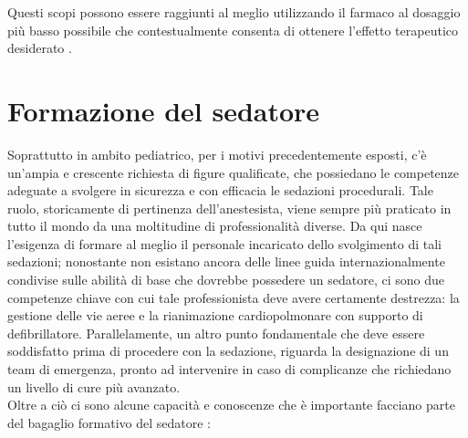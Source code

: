 Questi scopi possono essere raggiunti al meglio utilizzando il farmaco al dosaggio più basso possibile che contestualmente consenta di ottenere l'effetto terapeutico desiderato \cite{Guidelines2019}.

\section{Formazione del sedatore}

Soprattutto in ambito pediatrico, per i motivi precedentemente esposti, c'è un'ampia e crescente richiesta di figure qualificate, che possiedano le competenze adeguate a svolgere in sicurezza e con efficacia le sedazioni procedurali. Tale ruolo, storicamente di pertinenza dell'anestesista, viene sempre più praticato in tutto il mondo da una moltitudine di professionalità diverse. Da qui nasce l'esigenza di formare al meglio il personale incaricato dello svolgimento di tali sedazioni; nonostante non esistano ancora delle linee guida internazionalmente condivise sulle abilità di base che dovrebbe possedere un sedatore, ci sono due competenze chiave con cui tale professionista deve avere certamente destrezza: la gestione delle vie aeree e la rianimazione cardiopolmonare con supporto di defibrillatore. Parallelamente, un altro punto fondamentale che deve essere soddisfatto prima di procedere con la sedazione, riguarda la designazione di un team di emergenza, pronto ad intervenire in caso di complicanze che richiedano un livello di cure più avanzato.
\\Oltre a ciò ci sono alcune capacità e conoscenze che è importante facciano parte del bagaglio formativo del sedatore \cite{Simeupsedazione, Berkenbosch2015}: 
